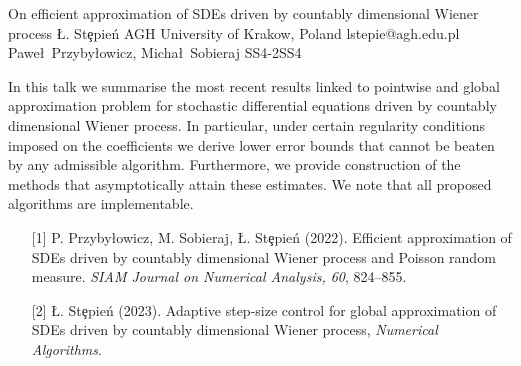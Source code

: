\begin{talk}
  {On efficient approximation of SDEs driven by countably dimensional Wiener process}%
  {\L. St\c epie\'n}%
  {AGH University of Krakow, Poland}%
  {lstepie@agh.edu.pl}%
  {Pawe\l \ Przyby\l owicz, Micha\l \ Sobieraj}%
{}{}{SS4-2}{SS4}

			
In this talk we summarise the most recent results linked to pointwise and global approximation problem for stochastic differential equations driven by countably dimensional Wiener process. In particular, under certain regularity conditions imposed on the coefficients we derive lower error bounds that cannot be beaten by any admissible algorithm. Furthermore, we provide construction of the methods that asymptotically attain these estimates. We note that all proposed algorithms are implementable.


\medskip

\begin{enumerate}
	\item[{[1]}] P. Przyby\l owicz, M. Sobieraj, \L. St\c epie\'n (2022). Efficient approximation of SDEs driven by countably
dimensional Wiener process and Poisson random measure. \textit{SIAM Journal on Numerical Analysis, 60}, 824--855.
	\item[{[2]}] \L. St\c epie\'n (2023). Adaptive step-size control for global approximation of SDEs driven by countably dimensional Wiener process, \textit{Numerical Algorithms}.
\end{enumerate}

\end{talk}

